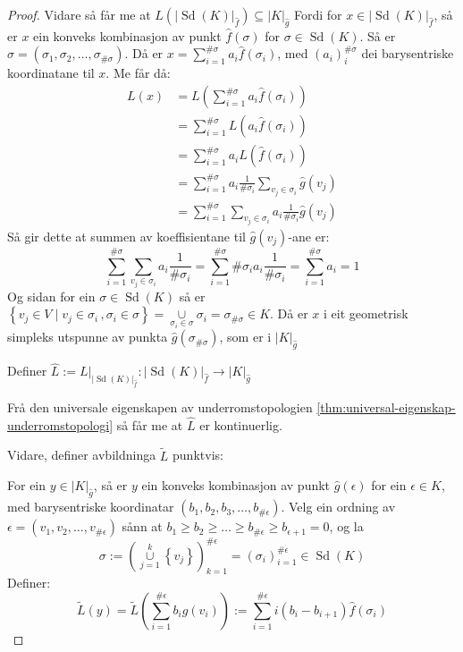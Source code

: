 \documentclass[a4paper, titlepage, 12pt, norsk]{article}
\theoremstyle{plain}
\theoremstyle{definition}
\newcommand{\union}{ \mathop{\cup}\limits }
\newcommand{\gr}[1]{ \lvert #1 \rvert } %
\newcommand{\set}[1]{ \left \{ #1 \right \} } %
\newcommand{\tuple}[1]{ \left( #1 \right) } %
\DeclareMathOperator{\Sd}{Sd}
\begin{document}
\begin{proof}
	Vidare så får me at \( L(\gr{\Sd(K)}_{\hat{f}}) \subseteq \gr{K}_{\hat{g}} \) Fordi for \( x \in \gr{\Sd(K)}_{\hat{f}} \), så er \( x \) ein konveks kombinasjon av punkt \( \hat{f}(\sigma) \) for \( \sigma \in \Sd(K) \). Så er \( \sigma = (\sigma_1, \sigma_2, \dots, \sigma_{\#\sigma}) \). Då er \( x = \sum_{i=1}^{\#\sigma} a_i \hat{f}(\sigma_i) \), med \( (a_i)_i^{\#\sigma} \) dei barysentriske koordinatane til \( x \). Me får då:
	\begin{align*}
		L(x) &= L\left(\sum_{i=1}^{\#\sigma} a_i \hat{f}(\sigma_i)\right) \\
		&= \sum_{i=1}^{\#\sigma} L(a_i \hat{f}(\sigma_i)) \\
		&= \sum_{i=1}^{\#\sigma} a_i L(\hat{f}(\sigma_i)) \\
		&= \sum_{i=1}^{\#\sigma} a_i \frac{1}{\#\sigma_i} \sum_{v_j \in \sigma_i} \hat{g}(v_j) \\
		&= \sum_{i=1}^{\#\sigma} \sum_{v_j \in \sigma_i} a_i \frac{1}{\#\sigma_i} \hat{g}(v_j)
	\end{align*}
	Så gir dette at summen av koeffisientane til \( \hat{g}(v_j) \)-ane er:
	\[
		\sum_{i=1}^{\#\sigma} \sum_{v_j \in \sigma_i} a_i \frac{1}{\#\sigma_i} = 
		\sum_{i=1}^{\#\sigma} \#\sigma_i a_i \frac{1}{\#\sigma_i} =
		\sum_{i=1}^{\#\sigma} a_i = 1
	\]
	Og sidan for ein \( \sigma \in \Sd(K) \) så er \( \set{v_j \in V \mid v_j \in \sigma_i \,, \sigma_i \in \sigma} = \union_{\sigma_i \in \sigma} \sigma_i = \sigma_{\#\sigma} \in K \). Då er \( x \) i eit geometrisk simpleks utspunne av punkta \( \hat{g}(\sigma_{\#\sigma}) \), som er i \( \gr{K}_{\hat{g}} \)

	Definer \( \hat{L} := L|_{\gr{\Sd(K)}_{\hat{f}}}: \gr{\Sd(K)}_{\hat{f}} \to \gr{K}_{\hat{g}} \)

	Frå den universale eigenskapen av underromstopologien \autoref{thm:universal-eigenskap-underromstopologi} så får me at \( \hat{L} \) er kontinuerlig.

	Vidare, definer avbildninga \( \tilde{L} \) punktvis:
	
	For ein \( y \in \gr{K}_{\hat{g}} \), så er \( y \) ein konveks kombinasjon av punkt \( \hat{g}(\epsilon) \) for ein \( \epsilon \in K \), med barysentriske koordinatar \( \tuple{b_1, b_2, b_3, \dots, b_{\#\epsilon}} \). Velg ein ordning av \( \epsilon = \tuple{v_1, v_2, \dots, v_{\#\epsilon}} \) sånn at \( b_1 \geq b_2 \geq \dots \geq b_{\#\epsilon} \geq  b_{\epsilon+1}=0 \), og la
	\[
		\sigma := \tuple{\union_{j=1}^k\set{v_j}}_{k=1}^{\#\epsilon} = \tuple{\sigma_i}_{i=1}^{\#\epsilon} \in \Sd(K)
	\]
	Definer:
	\[
		\tilde{L}(y) = \tilde{L}\tuple{\sum_{i=1}^{\#\epsilon} b_i \hat{g}(v_i)} := \sum_{i=1}^{\#\epsilon}i\tuple{b_i-b_{i+1}}\hat{f}(\sigma_i)
	\]


\end{proof}
\end{document}

